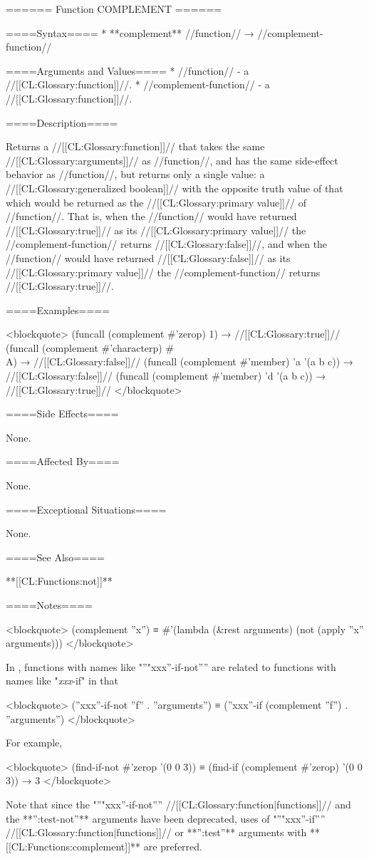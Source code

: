 ====== Function COMPLEMENT ======

====Syntax====
  * **complement** //function// → //complement-function//

====Arguments and Values====
  * //function// - a //[[CL:Glossary:function]]//.
  * //complement-function// - a //[[CL:Glossary:function]]//.

====Description====

Returns a //[[CL:Glossary:function]]// that takes the same //[[CL:Glossary:arguments]]// as //function//, and has the same side-effect behavior as //function//, but returns only a single value: a //[[CL:Glossary:generalized boolean]]// with the opposite truth value of that which would be returned as the //[[CL:Glossary:primary value]]// of //function//. That is, when the //function// would have returned //[[CL:Glossary:true]]// as its //[[CL:Glossary:primary value]]// the //complement-function// returns //[[CL:Glossary:false]]//, and when the //function// would have returned //[[CL:Glossary:false]]// as its //[[CL:Glossary:primary value]]// the //complement-function// returns //[[CL:Glossary:true]]//.

====Examples====

<blockquote> (funcall (complement #'zerop) 1) → //[[CL:Glossary:true]]// (funcall (complement #'characterp) #\\A) → //[[CL:Glossary:false]]// (funcall (complement #'member) 'a '(a b c)) → //[[CL:Glossary:false]]// (funcall (complement #'member) 'd '(a b c)) → //[[CL:Glossary:true]]// </blockquote>

====Side Effects====

None.

====Affected By====

None.

====Exceptional Situations====

None.

====See Also====

**[[CL:Functions:not]]**

====Notes====

<blockquote> (complement ''x'') ≡ #'(lambda (&rest arguments) (not (apply ''x'' arguments))) </blockquote>

In \clisp, functions with names like "''"xxx''-if-not'''' are related to functions with names like "\f{{\it xxx}-if}" in that

<blockquote> (''xxx''-if-not ''f'' . ''arguments'') ≡ (''xxx''-if (complement ''f'') . ''arguments'') </blockquote>

For example,

<blockquote> (find-if-not #'zerop '(0 0 3)) ≡ (find-if (complement #'zerop) '(0 0 3)) → 3 </blockquote>

Note that since the "''"xxx''-if-not'''' //[[CL:Glossary:function|functions]]// and the **'':test-not''** arguments have been deprecated, uses of "''"xxx''-if'''' //[[CL:Glossary:function|functions]]// or **'':test''** arguments with **[[CL:Functions:complement]]** are preferred.



